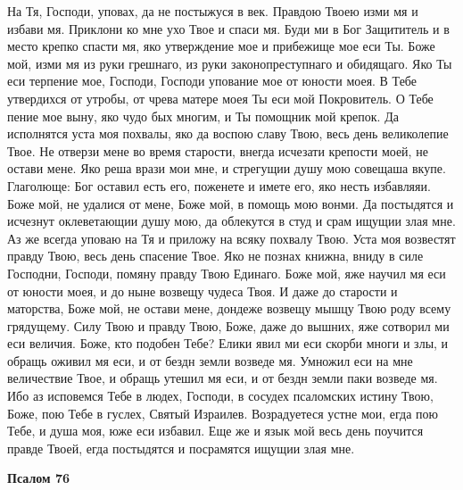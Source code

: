 На Тя, Господи, уповах, да не постыжуся в век. Правдою Твоею изми мя и избави мя. Приклони ко мне ухо Твое и спаси мя. Буди ми в Бог Защититель и в место крепко спасти мя, яко утверждение мое и прибежище мое еси Ты. Боже мой, изми мя из руки грешнаго, из руки законопреступнаго и обидящаго. Яко Ты еси терпение мое, Господи, Господи упование мое от юности моея. В Тебе утвердихся от утробы, от чрева матере моея Ты еси мой Покровитель. О Тебе пение мое выну, яко чудо бых многим, и Ты помощник мой крепок. Да исполнятся уста моя похвалы, яко да воспою славу Твою, весь день великолепие Твое. Не отверзи мене во время старости, внегда исчезати крепости моей, не остави мене. Яко реша врази мои мне, и стрегущии душу мою совещаша вкупе. Глаголюще: Бог оставил есть его, поженете и имете его, яко несть избавляяи. Боже мой, не удалися от мене, Боже мой, в помощь мою вонми. Да постыдятся и исчезнут оклеветающии душу мою, да облекутся в студ и срам ищущии злая мне. Аз же всегда уповаю на Тя и приложу на всяку похвалу Твою. Уста моя возвестят правду Твою, весь день спасение Твое. Яко не познах книжна, вниду в силе Господни, Господи, помяну правду Твою Единаго. Боже мой, яже научил мя еси от юности моея, и до ныне возвещу чудеса Твоя. И даже до старости и маторства, Боже мой, не остави мене, дондеже возвещу мышцу Твою роду всему грядущему. Силу Твою и правду Твою, Боже, даже до вышних, яже сотворил ми еси величия. Боже, кто подобен Тебе? Елики явил ми еси скорби многи и злы, и обращь оживил мя еси, и от бездн земли возведе мя. Умножил еси на мне величествие Твое, и обращь утешил мя еси, и от бездн земли паки возведе мя. Ибо аз исповемся Тебе в людех, Господи, в сосудех псаломских истину Твою, Боже, пою Тебе в гуслех, Святый Израилев. Возрадуетеся устне мои, егда пою Тебе, и душа моя, юже еси избавил. Еще же и язык мой весь день поучится правде Твоей, егда постыдятся и посрамятся ищущии злая мне.





\bfseries Псалом 76\normalfont{}


